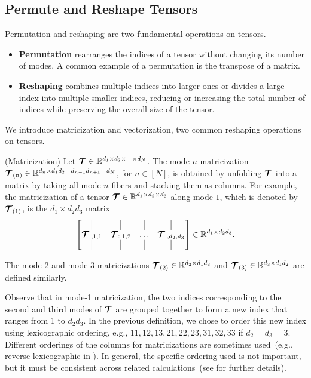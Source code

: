 \subsection{Permute and Reshape Tensors}
Permutation and reshaping are two fundamental operations on tensors.
\begin{itemize}
    \item \textbf{Permutation} rearranges the indices of a tensor without changing its number of modes. A common example of a permutation is the transpose of a matrix.
    \item  \textbf{Reshaping} combines multiple indices into larger ones or divides a large index into multiple smaller indices, reducing or increasing the total number of indices while preserving the overall size of the tensor.
\end{itemize}
We introduce matricization and vectorization, two common reshaping operations on tensors.
\begin{definition}(Matricization)\label{matricizitation:def}
Let $\bm{\mathcal{T}}\in\mathbb{R}^{d_1\times d_2\times \cdots\times d_N}$. The mode-$n$ matricization  $\bm{\mathcal{T}}_{(n)}\in\mathbb{R}^{d_n\times d_1d_2\cdots d_{n-1}d_{n+1}\cdots d_N}$, for $n\in[N]$, is obtained by unfolding $\bm{\mathcal{T}}$ into a matrix by taking all mode-$n$ fibers and stacking them as columns. For example, the matricization of a tensor $\bm{\mathcal{T}}\in\mathbb{R}^{d_1\times d_2\times d_3}$ along mode-$1$, which is denoted by $\bm{\mathcal{T}}_{(1)}$, is the $d_1\times d_2d_3$ matrix
$$
    \begin{bmatrix}
    \vline & \vline & \vline  & \vline \\
    \Tt_{:,1,1} & {\Tt}_{:,1,2}  & \dots  & {\Tt}_{:,d_2,d_3} \\
    \vline & \vline & \vline  & \vline 
    \end{bmatrix}
\in\RR^{d_1\times d_2d_3}.
$$

The mode-2 and mode-3 matricizations $\bm{\mathcal{T}}_{(2)}\in\mathbb{R}^{d_2\times d_1d_3}$ and $\bm{\mathcal{T}}_{(3)}\in\mathbb{R}^{d_3\times d_1d_2}$ are defined similarly.
\end{definition}

Observe that in mode-1 matricization, the two indices corresponding to the second and third modes of $\bm{\mathcal{T}}$ are grouped together to form a new index that ranges from 1 to $d_2d_3$. In the previous definition, we chose to order this new index using lexicographic ordering, e.g., $11,12,13,21,22,23,31,32,33$ if $d_2=d_3=3$. Different orderings of the columns for matricizations are sometimes used~(e.g., reverse lexicographic in \citep{kolda2009tensor}). In general, the specific ordering
used is not important, but it must be consistent across related calculations~(see \citep{kolda2006multilinear} for further details).



